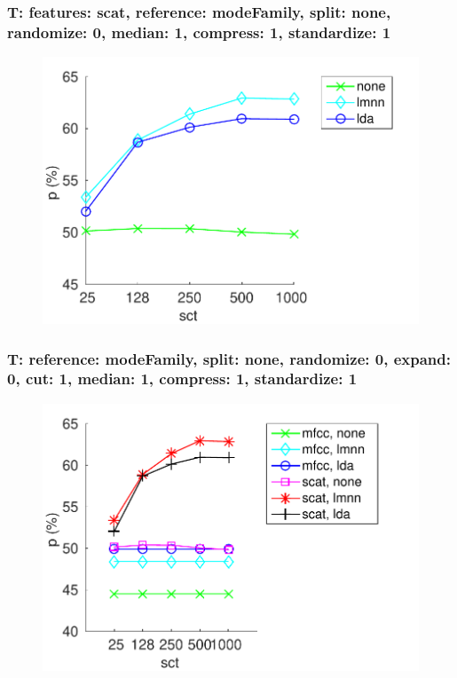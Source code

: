 \documentclass{beamer}
\begin{document}
\begin{frame}\frametitle{\small T: features: scat, reference: modeFamily, split: none, randomize: 0, median: 1, compress: 1, standardize: 1}
\begin{center}
\begin{figure}
\centering
\includegraphics[width=\textwidth,height=0.8\textheight,keepaspectratio]{./figures/Fig147.pdf}
\label{fescRemofaSpnoRa0Me1Co1St1}
\end{figure}
\end{center}


\end{frame}

\begin{frame}\frametitle{\small T: reference: modeFamily, split: none, randomize: 0, expand: 0, cut: 1, median: 1, compress: 1, standardize: 1}
\begin{center}
\begin{figure}
\centering
\includegraphics[width=\textwidth,height=0.8\textheight,keepaspectratio]{./figures/Fig148.pdf}
\label{remofaSpnoRa0Ex0Cu1Me1Co1St1}
\end{figure}
\end{center}


\end{frame}
\end{document}
